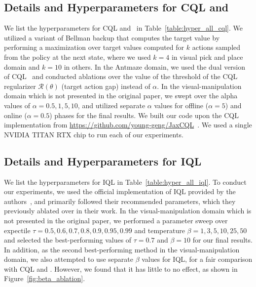 \subsection{Details and Hyperparameters for CQL and \methodname\ }
We list the hyperparameters for CQL and \methodname\ in Table~\ref{table:hyper_all_cql}. We utilized a variant of Bellman backup that computes the target value by performing a maximization over target values computed for $k$ actions sampled from the policy at the next state, where we used $k=4$ in visual pick and place domain and $k=10$ in others. In the Antmaze domain, we used the dual version of CQL~\citep{kumar2020conservative} and conducted ablations over the value of the threshold of the CQL regularizer $\mathcal{R}(\theta)$ (target action gap) instead of $\alpha$. In the visual-manipulation domain which is not presented in the original paper, we swept over the alpha values of $\alpha=0.5, 1, 5, 10$, and utilized separate $\alpha$ values for offline ($\alpha=5$) and online ($\alpha=0.5$) phases for the final results. We built our code upon the CQL implementation from \url{https://github.com/young-geng/JaxCQL}~\cite{geng2022jaxcql}. We used a single NVIDIA TITAN RTX chip to run each of our experiments.

\subsection{Details and Hyperparameters for IQL}
We list the hyperparameters for IQL in Table~\ref{table:hyper_all_iql}. To conduct our experiments, we used the official implementation of IQL provided by the authors~\citep{kostrikov2021offlineb}, and primarily followed their recommended parameters, which they previously ablated over in their work. In the visual-manipulation domain which is not presented in the original paper, we performed a parameter sweep over expectile $\tau = 0.5, 0.6, 0.7, 0.8, 0.9, 0.95, 0.99$ and temperature $\beta = 1, 3, 5, 10, 25, 50$ and selected the best-performing values of $\tau = 0.7$ and $\beta = 10$ for our final results. In addition, as the second best-performing method in the visual-manipulation domain, we also attempted to use separate $\beta$ values for IQL, for a fair comparison with CQL and \methodname. However, we found that it has little to no effect, as shown in Figure~\ref{fig:beta_ablation}. 

